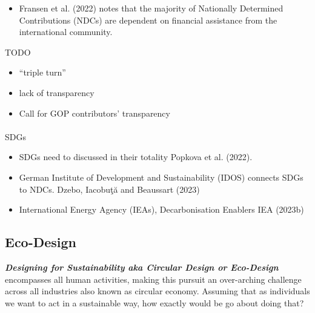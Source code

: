 \documentclass[
  letterpaper,
  DIV=11,
  numbers=noendperiod]{scrartcl}
\makeatletter
\let\oldparagraph\paragraph
\renewcommand{\paragraph}{
    \@ifstar
      \xxxParagraphStar
      \xxxParagraphNoStar
  }
\newcommand{\xxxParagraphStar}[1]{\oldparagraph*{#1}\mbox{}}
\newcommand{\xxxParagraphNoStar}[1]{\oldparagraph{#1}\mbox{}}
\providecommand{\tightlist}{%
  \setlength{\itemsep}{0pt}\setlength{\parskip}{0pt}}\usepackage{longtable,booktabs,array}
\makeatother
\begin{document}
\begin{itemize}
\tightlist
\item
  Fransen et al. (2022) notes that the majority of Nationally Determined
  Contributions (NDCs) are dependent on financial assistance from the
  international community.
\end{itemize}

TODO

\begin{itemize}
\tightlist
\item
  ``triple turn''
\item
  lack of transparency
\item
  Call for GOP contributors' transparency
\end{itemize}

\paragraph{SDGs}\label{sdgs}

\begin{itemize}
\item
  SDGs need to discussed in their totality Popkova et al. (2022).
\item
  German Institute of Development and Sustainability (IDOS) connects
  SDGs to NDCs. Dzebo, Iacobuţă and Beaussart (2023)
\item
  International Energy Agency (IEAs), Decarbonisation Enablers IEA
  (2023b)
\end{itemize}

\subsection{Eco-Design}\label{eco-design}

\textbf{\emph{Designing for Sustainability aka Circular Design or
Eco-Design}} encompasses all human activities, making this pursuit an
over-arching challenge across all industries also known as circular
economy. Assuming that as individuals we want to act in a sustainable
way, how exactly would be go about doing that?
\end{document}
